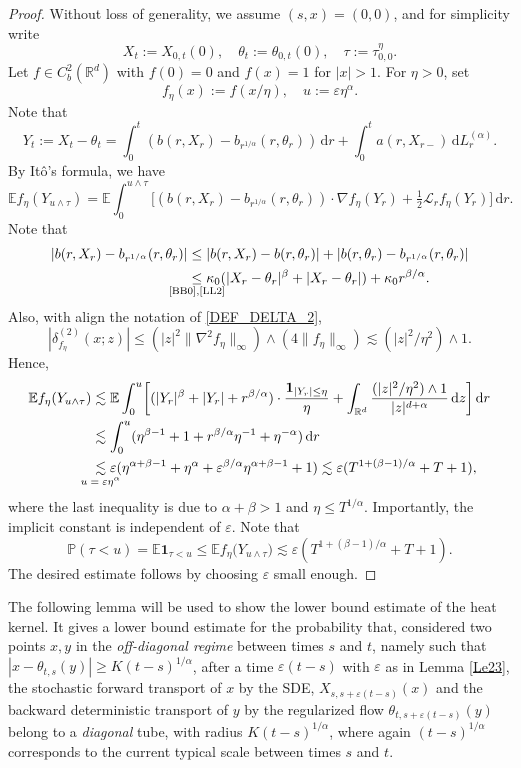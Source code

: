 \documentclass[JEP,XML,SOM,Unicode,published]{cedram}
\newcommand{\sm}[1]{\makebox[0pt][c]{\scriptsize#1}}
\theoremstyle{plain}
\theoremstyle{definition}
\let\eps\varepsilon
\newcommand\cL{{\mathcal L}}
\newcommand\mE{\mathbb{E}}
\newcommand\mP{\mathbb{P}}
\newcommand\mR{\mathbb{R}}
\newcommand\1{{\mathbf{1}}}
\newcommand{\dif}{\,\mathrm{d}}
\begin{document}
\begin{proof}
Without loss of generality, we assume $(s,x)=(0,0)$, and for simplicity write
\[
X_t:=X_{0,t}(0),\quad \theta_t:=\theta_{0,t}(0),\quad \tau:=\tau^\eta_{0,0}.
\]
Let $f\in C^2_b(\mR^d)$ with $f(0)=0$ and $f(x)=1$ for $|x|>1$. For $\eta>0$, set
\[
f_\eta(x):=f(x/\eta),\quad u:=\eps\eta^\alpha.
\]
Note that
\[
Y_t:=X_t-\theta_t=\int^t_0(b(r,X_r)-b_{r^{1/\alpha}}(r,\theta_r))\dif r+\int^t_0a(r,X_{r-})\dif L^{(\alpha)}_r.
\]
By Itô's formula, we have
\begin{equation*}
\mE f_\eta(Y_{u\wedge\tau})=\mE\int^{u\wedge\tau}_0\!\!\Big[(b(r,X_r)-b_{r^{1/\alpha}}(r,\theta_r))\cdot\nabla f_\eta(Y_r)
+\tfrac12\cL_r f_\eta(Y_r)\Big]\dif r.
\end{equation*}
Note that
\begin{align*}
|b(r,X_r)-b_{r^{1/\alpha}}(r,\theta_r)|
&\leq|b(r,X_r)-b(r,\theta_r)|+|b(r,\theta_r)-b_{r^{1/\alpha}}(r,\theta_r)|
\\&\underset{\sm{\eqref{BB0},\eqref{LL2}}}{\leq}\kappa_0(|X_r-\theta_r|^\beta+|X_r-\theta_r|)+\kappa_0r^{\beta/\alpha}.
\end{align*}
Also, with align the notation of \eqref{DEF_DELTA_2},
\[
|\delta^{(2)}_{f_\eta}(x;z)|\leq (|z|^2\|\nabla^2 f_\eta\|_\infty)\wedge(4\|f_\eta\|_\infty)\lesssim (|z|^2/\eta^2)\wedge 1.
\]
Hence,
\begin{align*}
\mE f_\eta(Y_{u\wedge\tau})&\lesssim\mE\int^{u}_0\biggl[(|Y_r|^\beta+|Y_r|+r^{\beta/\alpha})\cdot\frac{\1_{|Y_r|\leq\eta}}{\eta}
+\int_{\mR^d}\frac{(|z|^2/\eta^2)\wedge 1}{|z|^{d+\alpha}}\dif z\biggr]\dif r
\\&\lesssim\int^{u}_0(\eta^{\beta-1}+1+r^{\beta/\alpha}\eta^{-1}+\eta^{-\alpha})\dif r
\\&\underset{\sm{$u=\eps\eta^\alpha$}}{\lesssim} \eps(\eta^{\alpha+\beta-1}+\eta^\alpha+ \eps^{\beta/\alpha}\eta^{\alpha+\beta-1}+1)
\lesssim \eps( T^{1+(\beta-1)/\alpha}+T+1),
\end{align*}
where the last inequality is due to $\alpha+\beta>1$ and $\eta\leq T^{1/\alpha}$. Importantly, the implicit constant is
independent of $\eps$. Note that
\begin{equation*}
\mP(\tau<u)=\mE\1_{\tau<u}\leq\mE f_{\eta}\bigl(Y_{u\wedge\tau}\bigr)\lesssim \eps(T^{1+(\beta-1)/\alpha}+T+1).
\end{equation*}
The desired estimate follows by choosing $\eps$ small enough.
\end{proof}
The following lemma will be used to show the lower bound estimate of the heat kernel.
It gives a lower bound estimate for the probability that, considered two points $x,y$ in the \textit{off-diagonal regime} between times $s$ and $t$, namely such that $ |x-\theta_{t,s}(y)|\ge K(t-s)^{1/\alpha}$, after a time $\varepsilon (t-s)$ with $\eps $ as in Lemma \ref{Le23}, the stochastic forward transport of $x$ by the SDE, \ie $X_{s,s+\eps(t-s)}(x) $ and the backward deterministic transport of $y$ by the regularized flow $\theta_{t,s+\eps(t-s)}(y) $ belong to a \textit{diagonal} tube, with radius $K(t-s)^{1/\alpha} $,
where again $(t-s)^{1/\alpha} $ corresponds to the current typical scale between times $s$ and $t$.
\end{document}
